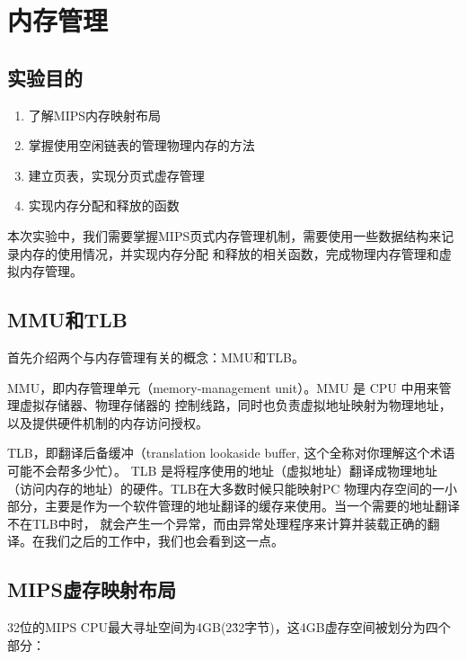 \chapter{内存管理}

\section{实验目的}
  \begin{enumerate}
    \item 了解MIPS内存映射布局
    \item 掌握使用空闲链表的管理物理内存的方法
    \item 建立页表，实现分页式虚存管理
    \item 实现内存分配和释放的函数
  \end{enumerate}

本次实验中，我们需要掌握MIPS页式内存管理机制，需要使用一些数据结构来记录内存的使用情况，并实现内存分配
和释放的相关函数，完成物理内存管理和虚拟内存管理。

\section{MMU和TLB}

首先介绍两个与内存管理有关的概念：MMU和TLB。

\begin{note}
MMU，即内存管理单元（memory‐management unit）。MMU 是 CPU 中用来管理虚拟存储器、物理存储器的
控制线路，同时也负责虚拟地址映射为物理地址，以及提供硬件机制的内存访问授权。
\end{note}

\begin{note}
TLB，即翻译后备缓冲（translation lookaside buffer, 这个全称对你理解这个术语可能不会帮多少忙）。
TLB 是将程序使用的地址（虚拟地址）翻译成物理地址（访问内存的地址）的硬件。TLB在大多数时候只能映射PC
物理内存空间的一小部分，主要是作为一个软件管理的地址翻译的缓存来使用。当一个需要的地址翻译不在TLB中时，
就会产生一个异常，而由异常处理程序来计算并装载正确的翻译。在我们之后的工作中，我们也会看到这一点。
\end{note}

\section{MIPS虚存映射布局}

32位的MIPS CPU最大寻址空间为4GB(2\^32字节)，这4GB虚存空间被划分为四个部分：

